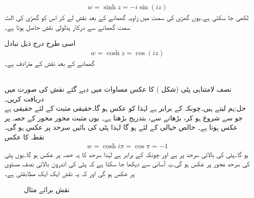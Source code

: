 \begin{align}\label{مساوات_نقش_ہذلولی_سائن_تفاعل}
w=\sinh z=-i\sin (iz)
\end{align}
لکھی جا سکتی ہے۔یوں گھڑی کی سمت میں  زاویہ گھمانے  کے بعد نقش  لے کر اس کو گھڑی کی الٹ سمت   گھمانے سے درکار ہذلولی نقش حاصل ہوتا ہے۔

اسی طرح درج ذیل تبادل
\begin{align}\label{مساوات_نقش_ہذلولی_کوسائن_تفاعل}
w=\cosh z=\cos (iz)
\end{align}
گھمانے  کے بعد نقش  کے مترادف ہے۔ 

\quad {}\\
نصف لامتناہی پٹی  (شکل ) کا عکس مساوات  میں دیے گئے نقش کی صورت میں دریافت کریں۔\\
حل:\quad ہم  لیتے ہیں۔چونکہ  کے برابر ہے لہٰذا  کو عکس  ہو گا۔حقیقی مثبت  کے لئے  حقیقی ہے جو  سے شروع ہو کر،  بڑھانے سے، بتدریج بڑھتا ہے۔ یوں مثبت  محور  محور کے حصہ  پر عکس ہوتا ہے۔ خالص خیالی  کے لئے  ہو گا لہٰذا پٹی کی بائیں سرحد  پر عکس ہو گی۔نقطہ  کا عکس
\begin{align*}
w=\cosh i\pi=\cos \pi=-1
\end{align*} 
ہو گا۔پٹی کی بالائی سرحد پر  ہے اور چونکہ  کے برابر ہے لہٰذا سرحد کا یہ حصہ  پر عکس ہو گا۔یوں پٹی کی سرحد  محور پر عکس ہو گی۔یہ آسانی سے دیکھا جا سکتا ہے کہ پٹی کی اندرون بالائی نصف  مستوی پر عکس ہو گی اور  کہ یہ نقش ایک ایک مطابقتی ہے۔
\begin{figure}
\centering
\begin{subfigure}{0.5\textwidth}
\centering
{}
\end{subfigure}%
\begin{subfigure}{0.5\textwidth}
\centering
{}
\end{subfigure}%
\caption{نقش برائے مثال }
\label{شکل_مثال_نقش_ہذلولی_کوسائن_عکس-لامتناہی_پٹی}
\end{figure}
